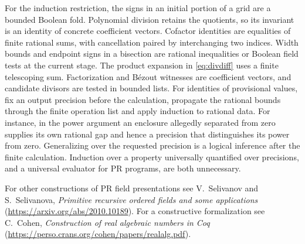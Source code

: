 For the induction restriction, the signs in an initial portion of
a grid are a bounded Boolean fold. Polynomial division retains the
quotients, so its invariant is an identity of concrete coefficient
vectors. Cofactor identities are equalities of finite rational sums,
with cancellation paired by interchanging two indices. Width bounds
and endpoint signs in a bisection are rational inequalities or Boolean
field tests at the current stage. The product expansion in
\eqref{eq:divdiff} uses a finite telescoping sum. Factorization and
B\'ezout witnesses are coefficient vectors, and candidate divisors are
tested in bounded lists. For identities of provisional values, fix an
output precision before the calculation, propagate the rational bounds
through the finite operation list and apply induction to rational
data. For instance, in the power argument an enclosure allegedly
separated from zero supplies its own rational gap and hence a
precision that distinguishes its power from zero. Generalizing over
the requested precision is a logical inference after the finite
calculation. Induction over a property universally quantified over
precisions, and a universal evaluator for PR programs, are both
unnecessary.

For other constructions of PR field presentations see V.~Selivanov and
S.~Selivanova, \emph{Primitive recursive ordered fields and some
applications} (\url{https://arxiv.org/abs/2010.10189}). For a constructive
formalization see C.~Cohen, \emph{Construction of real algebraic numbers
in Coq} (\url{https://perso.crans.org/cohen/papers/realalg.pdf}).
